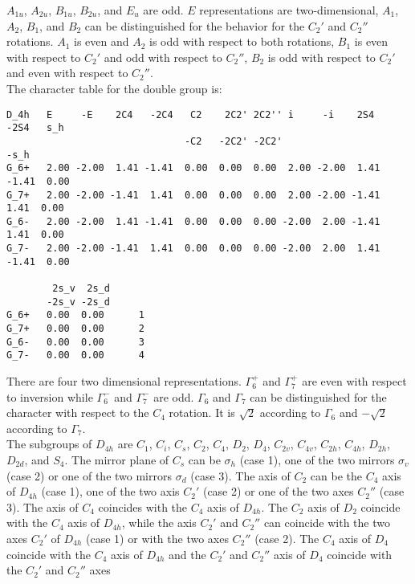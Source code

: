 \documentclass[12pt,a4paper]{article}
\begin{document}
$A_{1u}$, $A_{2u}$, $B_{1u}$, $B_{2u}$, and $E_u$ are odd.
$E$ representations are two-dimensional, $A_1$, $A_2$, $B_1$, and $B_2$ can
be distinguished for the behavior for the $C_2'$ and $C_2''$ rotations.
$A_1$ is even and $A_2$ is odd with respect to both rotations, 
$B_1$ is even with respect to $C_2'$ and odd with respect to $C_2''$,
$B_2$ is odd with respect to $C_2'$ and even with respect to $C_2''$. \\
The character table for the double group is:
\begin{footnotesize}
\begin{verbatim}
D_4h   E     -E    2C4   -2C4   C2    2C2' 2C2'' i     -i    2S4   -2S4   s_h 
                               -C2   -2C2' -2C2'                         -s_h 
G_6+   2.00 -2.00  1.41 -1.41  0.00  0.00  0.00  2.00 -2.00  1.41 -1.41  0.00
G_7+   2.00 -2.00 -1.41  1.41  0.00  0.00  0.00  2.00 -2.00 -1.41  1.41  0.00
G_6-   2.00 -2.00  1.41 -1.41  0.00  0.00  0.00 -2.00  2.00 -1.41  1.41  0.00
G_7-   2.00 -2.00 -1.41  1.41  0.00  0.00  0.00 -2.00  2.00  1.41 -1.41  0.00

        2s_v  2s_d
       -2s_v -2s_d
G_6+   0.00  0.00      1
G_7+   0.00  0.00      2
G_6-   0.00  0.00      3
G_7-   0.00  0.00      4
\end{verbatim}
\end{footnotesize}
There are four two dimensional representations. $\Gamma_6^+$ and $\Gamma_7^+$
are even with respect to inversion while $\Gamma_6^-$ and $\Gamma_7^-$ are 
odd. $\Gamma_6$ and $\Gamma_7$ can be distinguished for the character with
respect to the $C_4$ rotation. It is $\sqrt{2}$ according to $\Gamma_6$ and
$-\sqrt{2}$ according to $\Gamma_7$. \\
The subgroups of $D_{4h}$ are $C_1$, $C_i$, $C_s$, $C_2$, $C_4$, $D_2$, $D_4$,
$C_{2v}$, $C_{4v}$, $C_{2h}$, $C_{4h}$, $D_{2h}$, $D_{2d}$, and $S_4$. 
The mirror plane of $C_s$ can be $\sigma_h$ (case 1), one of the two mirrors 
$\sigma_v$ (case 2) or one of the two mirrors $\sigma_d$ (case 3). 
The axis of $C_2$ can be the $C_4$ axis of $D_{4h}$ (case 1), 
one of the two axis $C_2'$ (case 2) or one of the two axes $C_2''$ (case 3). 
The axis of $C_4$ coincides with the $C_4$ axis of $D_{4h}$. 
The $C_2$ axis of $D_2$ coincide with the $C_4$ axis of $D_{4h}$, while
the axis $C_2'$ and $C_2''$ can coincide with the two axes $C_2'$ of
$D_{4h}$ (case 1) or with the two axes $C_2''$ (case 2).
The $C_4$ axis of $D_4$ coincide with the $C_4$ axis of $D_{4h}$ and
the $C_2'$ and $C_2''$ axis of $D_4$ coincide with the $C_2'$ and $C_2''$ axes
\end{document}
